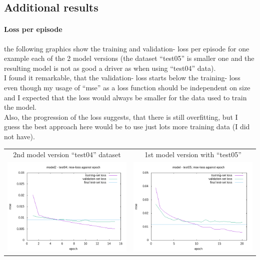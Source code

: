 \documentclass[a4paper]{article}
\begin{document}
\subsection{Additional results}
\paragraph{Loss per episode}
the following graphics show the training and validation- loss per episode for
one example each of the 2 model versions (the dataset \enquote{test05} is smaller one
and the resulting model is not as good a driver as when using \enquote{test04} data).
\\
I found it remarkable, that the validation- loss starts below the training- loss even
though my usage of \enquote{mse} as a loss function should be independent on size
and I expected that the loss would always be smaller for the data used to train the model.
\\
Also, the progression of the loss suggests, that there is still overfitting, but
I guess the best approach here would be to use just lots more training data (I did not have).

\begin{tabular}{ |c|c| }
  \hline
  2nd model version \enquote{test04} dataset & 1st model version with \enquote{test05} \\
  \includegraphics[scale=0.35]{model2_test04.png} & \includegraphics[scale=0.35]{./model_test05.png} \\
  \hline
\end{tabular}
\end{document}
